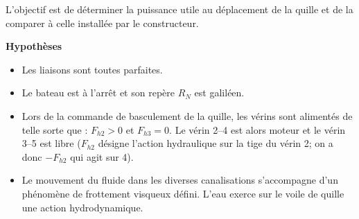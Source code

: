 \documentclass[10pt,fleqn]{article} %
\begin{document}
\begin{multicols}{2}
\begin{multicols}{2}


\fi
\begin{obj}
L’objectif est de déterminer la puissance utile au déplacement de la quille et de la comparer à celle installée
par le constructeur.
\end{obj}

\ifprof
\else
%



\textbf{Hypothèses}

\begin{itemize}
\item Les liaisons sont toutes parfaites.
\item Le bateau est à l’arrêt et son repère $R_N$ est galiléen.
\item Lors de la commande de basculement de la quille, les vérins sont alimentés de telle sorte que : $F_{h2} > 0$ et
$F_{h3} = 0$. Le vérin 2--4 est alors moteur et le vérin 3--5 est libre ($F_{h2}$ désigne l'action hydraulique sur la tige du vérin 2; on a donc $-F_{h2}$ qui agit sur 4).
\item Le mouvement du fluide dans les diverses canalisations s’accompagne d’un phénomène de frottement visqueux défini. L’eau exerce sur le voile de quille une action hydrodynamique.
\end{itemize}


\end{multicols}
\end{multicols}
\end{document}

